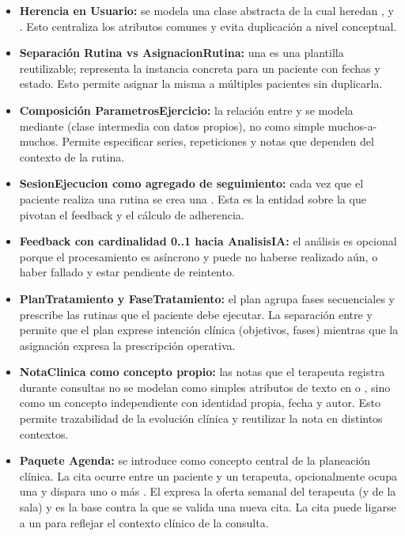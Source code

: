 \begin{itemize}
  \item \textbf{Herencia en Usuario:} se modela una clase abstracta  de la cual heredan ,  y . Esto centraliza los atributos comunes y evita duplicación a nivel conceptual.

  \item \textbf{Separación Rutina vs AsignacionRutina:} una  es una plantilla reutilizable;  representa la instancia concreta para un paciente con fechas y estado. Esto permite asignar la misma  a múltiples pacientes sin duplicarla.

  \item \textbf{Composición ParametrosEjercicio:} la relación entre  y  se modela mediante  (clase intermedia con datos propios), no como simple muchos-a-muchos. Permite especificar series, repeticiones y notas que dependen del contexto de la rutina.

  \item \textbf{SesionEjecucion como agregado de seguimiento:} cada vez que el paciente realiza una rutina se crea una . Esta es la entidad sobre la que pivotan el feedback y el cálculo de adherencia.

  \item \textbf{Feedback con cardinalidad 0..1 hacia AnalisisIA:} el análisis es opcional porque el procesamiento es asíncrono y puede no haberse realizado aún, o haber fallado y estar pendiente de reintento.

  \item \textbf{PlanTratamiento y FaseTratamiento:} el plan agrupa fases secuenciales y prescribe las rutinas que el paciente debe ejecutar. La separación entre  y  permite que el plan exprese intención clínica (objetivos, fases) mientras que la asignación expresa la prescripción operativa.

  \item \textbf{NotaClinica como concepto propio:} las notas que el terapeuta registra durante consultas no se modelan como simples atributos de texto en  o , sino como un concepto independiente con identidad propia, fecha y autor. Esto permite trazabilidad de la evolución clínica y reutilizar la nota en distintos contextos.

  \item \textbf{Paquete Agenda:} se introduce  como concepto central de la planeación clínica. La cita ocurre entre un paciente y un terapeuta, opcionalmente ocupa una  y dispara uno o más . El  expresa la oferta semanal del terapeuta (y de la sala) y es la base contra la que se valida una nueva cita. La cita puede ligarse a un  para reflejar el contexto clínico de la consulta.
\end{itemize}


